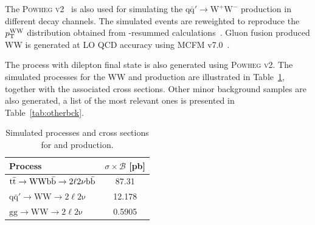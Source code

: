 The \textsc{Powheg v2}~\cite{Melia:2011tj} is also used for simulating the $\mathrm{q\bar{q}' \to W^+W^-}$ production in different decay channels. The simulated events are reweighted to reproduce the $p_\mathrm{T}^\mathrm{WW}$ distribution obtained from \pt-resummed calculations~\cite{Meade:2014fca,Jaiswal:2014yba}. Gluon fusion produced WW is generated at LO QCD accuracy using \textsc{MCFM} v7.0~\cite{Campbell:2013wga}.

The \ttbar process with dilepton final state is also generated using \textsc{Powheg v2}. The simulated processes for the WW and \ttbar production are illustrated in Table~\ref{tab:wwl}, together with the associated cross sections. Other minor background samples are also generated, a list of the most relevant ones is presented in Table~\ref{tab:otherbck}.

\begin{table}[htb]
\caption{Simulated processes and cross sections for \ttbar and \WW production.}\label{tab:wwl}
\begin{center}
\begin{tabular}{lc}
\toprule
Process & $\sigma\times\mathcal{B}$ [pb] \\
\midrule
$\mathrm{\mathrm{t}\bar{\mathrm{t}}\to WW b\bar{b}\to 2\ell2\nu b\bar{b}}$ & 87.31 \\
$\mathrm{q\bar{q}'\to WW \to 2\ell2\nu}$ & 12.178 \\
$\mathrm{gg\to WW \to 2\ell2\nu}$ & 0.5905 \\
\bottomrule
\end{tabular}
\end{center}
\end{table}


